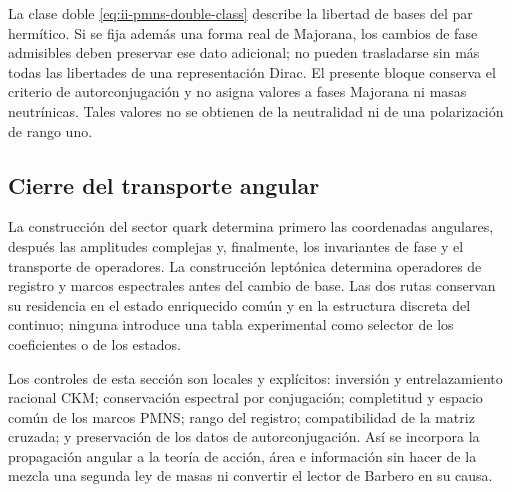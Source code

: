 \begin{remark}
La clase doble \eqref{eq:ii-pmns-double-class} describe la libertad de
bases del par hermítico. Si se fija además una forma real de Majorana,
los cambios de fase admisibles deben preservar ese dato adicional;
no pueden trasladarse sin más todas las libertades de una representación
Dirac. El presente bloque conserva el criterio de autorconjugación y
no asigna valores a fases Majorana ni masas neutrínicas. Tales valores
no se obtienen de la neutralidad ni de una polarización de rango uno.
\end{remark}

\subsection{Cierre del transporte angular}

La construcción del sector quark determina primero las coordenadas angulares, después
las amplitudes complejas y, finalmente, los invariantes de fase y el
transporte de operadores. La construcción leptónica determina operadores de
registro y marcos espectrales antes del cambio de base. Las dos rutas
conservan su residencia en el estado enriquecido común y en la estructura
discreta del continuo; ninguna introduce una tabla experimental como
selector de los coeficientes o de los estados.

Los controles de esta sección son locales y explícitos: inversión y
entrelazamiento racional CKM; conservación espectral por conjugación;
completitud y espacio común de los marcos PMNS; rango del registro;
compatibilidad de la matriz cruzada; y preservación de los datos de
autorconjugación. Así se incorpora la propagación angular a la teoría de
acción, área e información sin hacer de la mezcla una segunda ley de
masas ni convertir el lector de Barbero en su causa.

\par\endgroup
